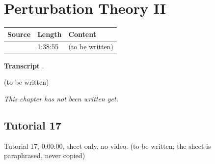 \chapter{Perturbation Theory II}\label{ch:c25}
\begin{paracol}{2}

\begin{sources}
\begin{tabularx}{\linewidth}{@{}l l L@{}}
\toprule
\textbf{Source} & \textbf{Length} & \textbf{Content}\\
\midrule
{} & 1:38:55 & (to be written)\\
\bottomrule
\end{tabularx}

\smallskip
\textbf{Transcript} .
\end{sources}

\begin{reading}
(to be written)
\end{reading}

\emph{This chapter has not been written yet.}

\section{Tutorial 17}\label{sec:t25-1}
Tutorial 17, 0:00:00, sheet only, no video. (to be written; the sheet is paraphrased, never copied)

\flushside
\end{paracol}
